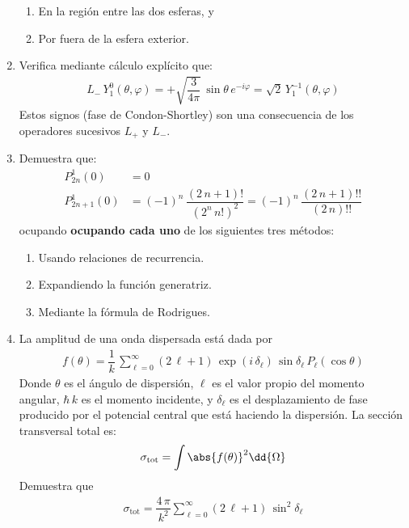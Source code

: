 \begin{enumerate}
\begin{enumerate}[label=\roman*)]
\item En la región entre las dos esferas, y
\item Por fuera de la esfera exterior.
\end{enumerate}
\item Verifica mediante cálculo explícito que:
\begin{align*}
L_{-} \, Y_{1}^{0} (\theta, \varphi) = + \sqrt{\dfrac{3}{4 \pi}} \, \sin \theta \, e^{-i \varphi} = \sqrt{2} \, Y_{1}^{-1} (\theta, \varphi)
\end{align*}
Estos signos (fase de Condon-Shortley) son una consecuencia de los operadores sucesivos $L_{+}$ y $L_{-}$.
\item Demuestra que:
\begin{align*}
P_{2n}^{1} (0) &= 0 \\[0.5em]
P_{2n+1}^{1} (0) &= (-1)^{n} \, \dfrac{(2 \, n +1)!}{(2^{n} \, n!)^{2}} = (-1)^{n} \, \dfrac{(2 \, n + 1)!!}{(2 \, n)!!}
\end{align*}
ocupando \textbf{ocupando cada uno} de los siguientes tres métodos:
\begin{enumerate}[label=(\alph*)]
\item Usando relaciones de recurrencia.
\item Expandiendo la función generatriz.
\item Mediante la fórmula de Rodrigues.
\end{enumerate}
\item La amplitud de una onda dispersada está dada por
\begin{align*}
f(\theta) = \dfrac{1}{k} \, \sum_{\ell = 0}^{\infty} (2 \, \ell + 1) \, \exp(i \, \delta_{\ell}) \, \sin \delta_{\ell} \, P_{\ell} (\cos \theta)
\end{align*}
Donde $\theta$ es el ángulo de dispersión, $\ell$ es el valor propio del momento angular, $\hbar \, k$ es el momento incidente, y $\delta_{\ell}$ es el desplazamiento de fase producido por el potencial central que está haciendo la dispersión. La sección transversal total es:
\begin{align*}
\sigma_{\text{tot}} = \int \abs{f(\theta)}^{2} \dd{\Omega}
\end{align*}
Demuestra que
\begin{align*}
\sigma_{\text{tot}} = \dfrac{4 \, \pi}{k^{2}} \sum_{\ell=0}^{\infty} (2 \, \ell + 1) \, \sin^{2} \delta_{\ell}
\end{align*}

\end{enumerate}
